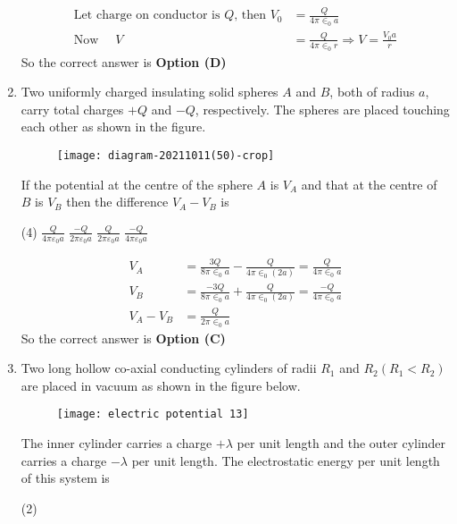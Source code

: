 \begin{enumerate}
\begin{answer}
\begin{align*}
		\text{Let charge on conductor is $Q$, then }V_{0}&=\frac{Q}{4 \pi \in_{0} a}\\
		\text{Now }\quad V&=\frac{Q}{4 \pi \in_{0} r} \Rightarrow V=\frac{V_{0} a}{r}
		\end{align*}
		So the correct answer is \textbf{Option (D)}
	\end{answer}
	\item Two uniformly charged insulating solid spheres $A$ and $B$, both of radius $a$, carry total charges $+Q$ and $-Q$, respectively. The spheres are placed touching each other as shown in the figure.\\
	\begin{figure}[H]
		\centering
		\texttt{[image: diagram-20211011(50)-crop]}
	\end{figure}
	If the potential at the centre of the sphere $A$ is $V_{A}$ and that at the centre of $B$ is $V_{B}$ then the difference $V_{A}-V_{B}$ is
	{}
	\begin{tasks}(4)
		\task[\textbf{A.}] $\frac{Q}{4 \pi \varepsilon_{0} a}$
		\task[\textbf{B.}] $\frac{-Q}{2 \pi \varepsilon_{0} a}$
		\task[\textbf{C.}] $\frac{Q}{2 \pi \varepsilon_{0} a}$
		\task[\textbf{D.}] $\frac{-Q}{4 \pi \varepsilon_{0} a}$
	\end{tasks}
	\begin{answer}
		\begin{align*}
		V_{A}&=\frac{3 Q}{8 \pi \in_{0} a}-\frac{Q}{4 \pi \in_{0}(2 a)}=\frac{Q}{4 \pi \in_{0} a}\\
		V_{B}&=\frac{-3 Q}{8 \pi \in_{0} a}+\frac{Q}{4 \pi \in_{0}(2 a)}=\frac{-Q}{4 \pi \in_{0} a}\\
		V_{A}-V_{B}&=\frac{Q}{2 \pi \in_{0} a}
		\end{align*}
		So the correct answer is \textbf{Option (C)}
	\end{answer}
	\item Two long hollow co-axial conducting cylinders of radii $R_{1}$ and $R_{2}\left(R_{1}<R_{2}\right)$ are placed in vacuum as shown in the figure below.\\
	\begin{figure}[H]
		\centering
		\texttt{[image: electric potential 13]}
	\end{figure}
	The inner cylinder carries a charge $+\lambda$ per unit length and the outer cylinder carries a charge $-\lambda$ per unit length. The electrostatic energy per unit length of this system is
	{}
	\begin{tasks}(2)

\end{tasks}
\end{enumerate}
